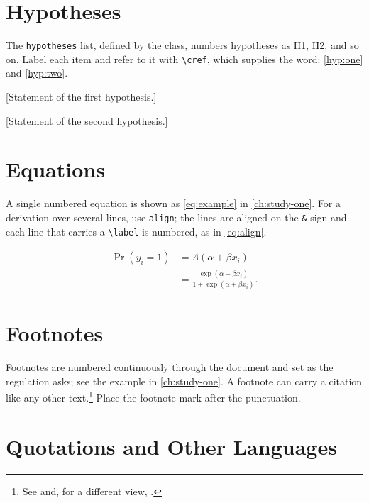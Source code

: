\section{Hypotheses}
\label{sec:hypotheses}

The \verb|hypotheses| list, defined by the class, numbers hypotheses as
H1, H2, and so on. Label each item and refer to it with \verb|\cref|,
which supplies the word: \cref{hyp:one} and \cref{hyp:two}.

\begin{hypotheses}
  \item \label{hyp:one} [Statement of the first hypothesis.]
  \item \label{hyp:two} [Statement of the second hypothesis.]
\end{hypotheses}

\section{Equations}
\label{sec:equations}

A single numbered equation is shown as \cref{eq:example} in
\cref{ch:study-one}. For a derivation over several lines, use
\verb|align|; the lines are aligned on the \verb|&| sign and each line
that carries a \verb|\label| is numbered, as in \cref{eq:align}.

\begin{align}
  \Pr(y_i = 1) &= \Lambda(\alpha + \beta x_i) \nonumber \\
               &= \frac{\exp(\alpha + \beta x_i)}
                       {1 + \exp(\alpha + \beta x_i)}.
  \label{eq:align}
\end{align}

\section{Footnotes}
\label{sec:footnotes}

Footnotes are numbered continuously through the document and set as the
regulation asks; see the example in \cref{ch:study-one}. A footnote can
carry a citation like any other text.\footnote{See \textcite{sartori1970}
and, for a different view, \textcite[690]{lijphart1971}.} Place the
footnote mark after the punctuation.

\section{Quotations and Other Languages}
\label{sec:quotations}

